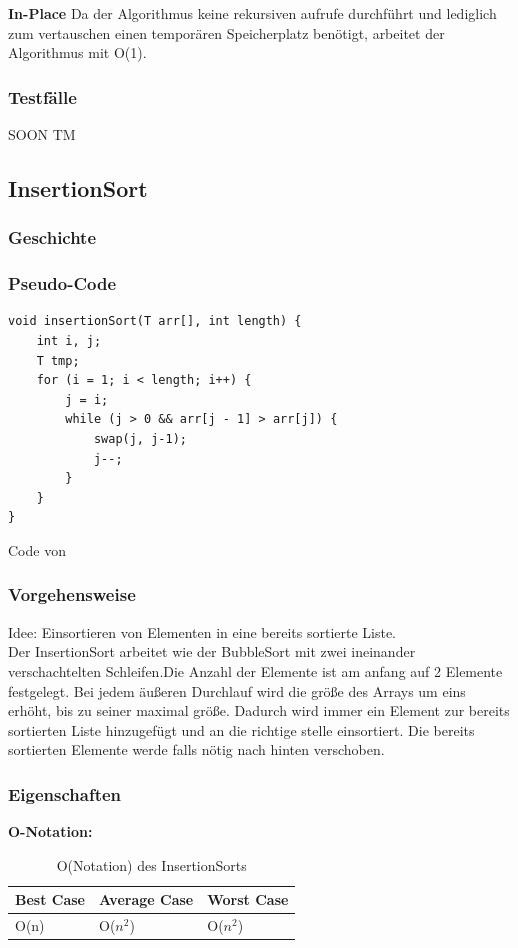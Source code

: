 \documentclass{article}
\begin{document}
\textbf{In-Place} Da der Algorithmus keine rekursiven aufrufe durchführt und lediglich zum vertauschen einen temporären Speicherplatz benötigt, arbeitet der Algorithmus mit O(1). \\




\subsubsection{Testfälle}
SOON TM

\subsection{InsertionSort}
\subsubsection{Geschichte}
\subsubsection{Pseudo-Code}
\begin{lstlisting}
void insertionSort(T arr[], int length) {
    int i, j;
    T tmp;
    for (i = 1; i < length; i++) {
        j = i;
        while (j > 0 && arr[j - 1] > arr[j]) {
            swap(j, j-1);
            j--;
        }
    }
}
\end{lstlisting}
Code von \cite{InsertionSortCode}

\subsubsection{Vorgehensweise}
Idee: Einsortieren von Elementen in eine bereits sortierte Liste. \\

Der InsertionSort arbeitet wie der BubbleSort mit zwei ineinander verschachtelten Schleifen.Die Anzahl der Elemente ist am anfang auf 2 Elemente festgelegt. Bei jedem äußeren Durchlauf wird die größe des Arrays um eins erhöht, bis zu seiner maximal größe. Dadurch wird immer ein Element zur bereits sortierten Liste hinzugefügt und an die richtige stelle einsortiert. Die bereits sortierten Elemente werde falls nötig nach hinten verschoben.

\subsubsection{Eigenschaften}
\textbf{O-Notation:}
\begin{table}[h]
\centering
\begin{tabular}{lll}
	\hline
	\textbf{Best Case} & \textbf{Average Case} & \textbf{Worst Case} \\
	\hline
	O(n) & O($n^{2}$) & O($n^{2}$) \\
	\hline
\end{tabular}
\caption{O(Notation) des InsertionSorts \cite{ONotationen}}
\label{tab:InsertionSort}
\end{table}
\end{document}
